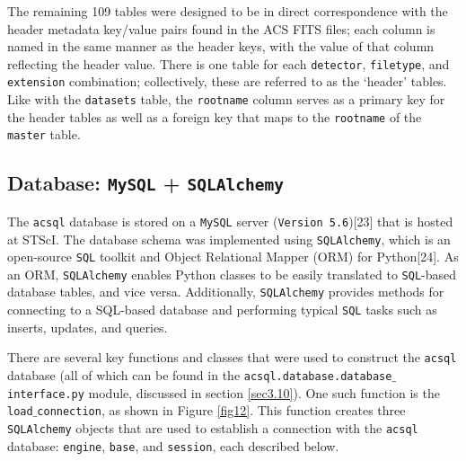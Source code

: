 \documentclass[10pt,journal,compsoc]{IEEEtran}
\begin{document}
The remaining 109 tables were designed to be in direct correspondence with the header metadata key/value pairs found in the ACS FITS files; each column is named in the same manner as
the header keys, with the value of that column reflecting the header value. There is one table for each \texttt{detector}, \texttt{filetype}, and \texttt{extension} combination;
collectively, these are referred to as the `header' tables.  Like with the \texttt{datasets} table, the \texttt{rootname} column serves as a primary key for the header tables as well
as a foreign key that maps to the \texttt{rootname} of the \texttt{master} table.


\subsection{Database: \texttt{MySQL} + \texttt{SQLAlchemy}} \label{sec3.6}

The \texttt{acsql} database is stored on a \texttt{MySQL} server (\texttt{Version 5.6})[23] that is hosted at STScI.  The database schema was implemented using \texttt{SQLAlchemy}, which
is an open-source \texttt{SQL} toolkit and Object Relational Mapper (ORM) for Python[24].  As an ORM, \texttt{SQLAlchemy} enables Python classes to be easily translated to
\texttt{SQL}-based database tables, and vice versa.  Additionally, \texttt{SQLAlchemy} provides methods for connecting to a SQL-based database and performing typical \texttt{SQL}
tasks such as inserts, updates, and queries.

There are several key functions and classes that were used to construct the \texttt{acsql} database (all of which can be found in the \texttt{acsql.database.database$\_$interface.py}
module, discussed in section \ref{sec3.10}). One such function is the \texttt{load$\_$connection}, as shown in Figure \ref{fig12}.  This function creates three \texttt{SQLAlchemy}
objects that are used to establish a connection with the \texttt{acsql} database: \texttt{engine}, \texttt{base}, and \texttt{session}, each described below.
\end{document}
